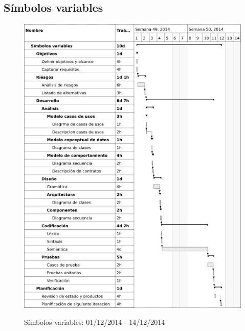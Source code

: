 \subsection{Símbolos variables}
\begin{center}
\begin{figure}[H]
\centering
\includegraphics[scale=1]{planning/6-simbolos-variables.png} \\
\caption{Símbolos variables: 01/12/2014 - 14/12/2014 }
\end{figure}
\end{center}


